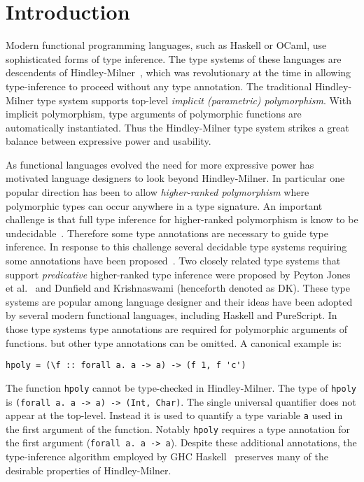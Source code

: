 \section{Introduction}

Modern functional programming languages, such as Haskell or OCaml,
use sophisticated forms of type inference. The type systems of these languages are
descendents of Hindley-Milner~\cite{}, which was revolutionary at the
time in allowing type-inference to proceed without any type
annotation. The traditional Hindley-Milner type system supports
top-level \emph{implicit (parametric) polymorphism}. With implicit
polymorphism, type arguments of polymorphic functions are
automatically instantiated. Thus the Hindley-Milner type system 
strikes a great balance between expressive power and usability. 

As functional languages evolved the need for more expressive
power has motivated language designers to look beyond Hindley-Milner.
In particular one popular direction has been to allow 
\emph{higher-ranked polymorphism} where polymorphic types can
occur anywhere in a type signature.  
An important challenge is that full type inference for higher-ranked
polymorphism is know to be undecidable~\cite{}. Therefore some type
annotations are necessary to guide type inference. In response to this 
challenge several decidable type systems requiring some annotations 
have been proposed~\cite{}. Two closely related type systems that 
support \emph{predicative} higher-ranked type inference were proposed 
by Peyton Jones et al.~\cite{} and Dunfield and
Krishnaswami (henceforth denoted as DK). 
These type systems are
popular among language designer and their ideas have been adopted by
several modern functional languages, including Haskell and PureScript.
In those type systems
type annotations are required for polymorphic arguments of functions.
but other type annotations can be omitted. A canonical example is:
\begin{verbatim}
hpoly = (\f :: forall a. a -> a) -> (f 1, f 'c')
\end{verbatim}
The function \verb|hpoly| cannot be
type-checked in Hindley-Milner.  The type of \verb|hpoly| is 
\verb|(forall a. a -> a) -> (Int, Char)|. The single universal quantifier
does not appear at the top-level. Instead it is used to quantify a
type variable \verb|a| used in the first argument of the
function.
Notably \verb|hpoly| requires a type annotation for the first
argument (\verb|forall a. a -> a|). 
Despite these additional annotations,
the type-inference algorithm employed by GHC Haskell~\cite{jones2007practical} preserves 
many of the desirable properties of Hindley-Milner. 

